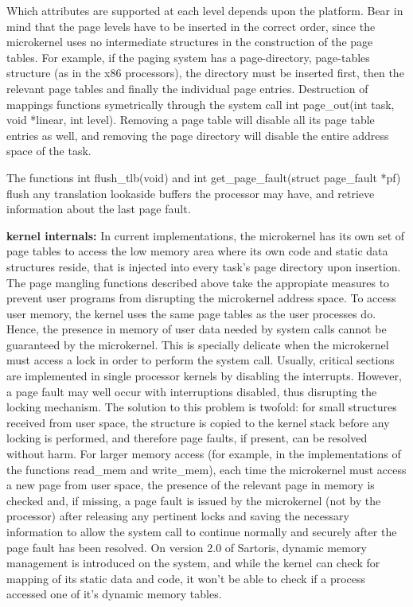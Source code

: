 \documentclass[11pt, letterpaper, twoside, english]{book}
\begin{document}
Which attributes are supported at each level depends upon the platform. Bear in mind that the page levels have to be inserted in the correct order, since the microkernel uses no intermediate structures in the construction of the page tables. For example, if the paging system has a page-directory, page-tables structure (as in the x86 processors), the directory must be inserted first, then the relevant page tables and finally the individual page entries. Destruction of mappings functions symetrically through the system call \textsf{int page\_out(int task, void *linear, int level)}. Removing a page table will disable all its page table entries as well, and removing the page directory will disable the entire address space of the task.

The functions \textsf{int flush\_tlb(void)} and \textsf{int get\_page\_fault(struct page\_fault *pf)} flush any translation lookaside buffers the processor may have, and retrieve information about the last page fault.

\textbf{kernel internals:} In current implementations, the microkernel has its own set of page tables to access the low memory area where its own code and static data structures reside, that is injected into every task's page directory upon insertion. The page mangling functions described above take the appropiate measures to prevent user programs from disrupting the microkernel address space. To access user memory, the kernel uses the same page tables as the user processes do. Hence, the presence in memory of user data needed by system calls cannot be guaranteed by the microkernel. This is specially delicate when the microkernel must access a lock in order to perform the system call. Usually, critical sections are implemented in single processor kernels by disabling the interrupts. However, a page fault may well occur with interruptions disabled, thus disrupting the locking mechanism. The solution to this problem is twofold: for small structures received from user space, the structure is copied to the kernel stack before any locking is performed, and therefore page faults, if present, can be resolved without harm. For larger memory access (for example, in the implementations of the functions \textsf{read\_mem} and \textsf{write\_mem}), each time the microkernel must access a new page from user space, the presence of the relevant page in memory is checked and, if missing, a page fault is issued by the microkernel (not by the processor) after releasing any pertinent locks and saving the necessary information to allow the system call to continue normally and securely after the page fault has been resolved. On version 2.0 of Sartoris, dynamic memory management is introduced on the system, and while the kernel can check for mapping of its static data and code, it won't be able to check if a process accessed one of it's dynamic memory tables.
\end{document}
